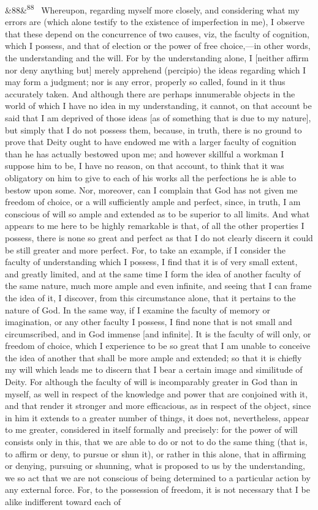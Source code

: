 \documentclass[12pt]{article}
\newcommand{\para}[1][]{\par\noindent\ifx&#1&\else\textsuperscript{\footnotesize #1}~\fi}
\begin{document}
\para[88] Whereupon, regarding myself more closely, and considering what my errors are (which alone testify to the existence of imperfection in me), I observe that these depend on the concurrence of two causes, viz, the faculty of cognition, which I possess, and that of election or the power of free choice,---in other words, the understanding and the will. For by the understanding alone, I [neither affirm nor deny anything but] merely apprehend (percipio) the ideas regarding which I may form a judgment; nor is any error, properly so called, found in it thus accurately taken. And although there are perhaps innumerable objects in the world of which I have no idea in my understanding, it cannot, on that account be said that I am deprived of those ideas [as of something that is due to my nature], but simply that I do not possess them, because, in truth, there is no ground to prove that Deity ought to have endowed me with a larger faculty of cognition than he has actually bestowed upon me; and however skillful a workman I suppose him to be, I have no reason, on that account, to think that it was obligatory on him to give to each of his works all the perfections he is able to bestow upon some. Nor, moreover, can I complain that God has not given me freedom of choice, or a will sufficiently ample and perfect, since, in truth, I am conscious of will so ample and extended as to be superior to all limits. And what appears to me here to be highly remarkable is that, of all the other properties I possess, there is none so great and perfect as that I do not clearly discern it could be still greater and more perfect. For, to take an example, if I consider the faculty of understanding which I possess, I find that it is of very small extent, and greatly limited, and at the same time I form the idea of another faculty of the same nature, much more ample and even infinite, and seeing that I can frame the idea of it, I discover, from this circumstance alone, that it pertains to the nature of God. In the same way, if I examine the faculty of memory or imagination, or any other faculty I possess, I find none that is not small and circumscribed, and in God immense [and infinite]. It is the faculty of will only, or freedom of choice, which I experience to be so great that I am unable to conceive the idea of another that shall be more ample and extended; so that it is chiefly my will which leads me to discern that I bear a certain image and similitude of Deity. For although the faculty of will is incomparably greater in God than in myself, as well in respect of the knowledge and power that are conjoined with it, and that render it stronger and more efficacious, as in respect of the object, since in him it extends to a greater number of things, it does not, nevertheless, appear to me greater, considered in itself formally and precisely: for the power of will consists only in this, that we are able to do or not to do the same thing (that is, to affirm or deny, to pursue or shun it), or rather in this alone, that in affirming or denying, pursuing or shunning, what is proposed to us by the understanding, we so act that we are not conscious of being determined to a particular action by any external force. For, to the possession of freedom, it is not necessary that I be alike indifferent toward each of 
\end{document}
